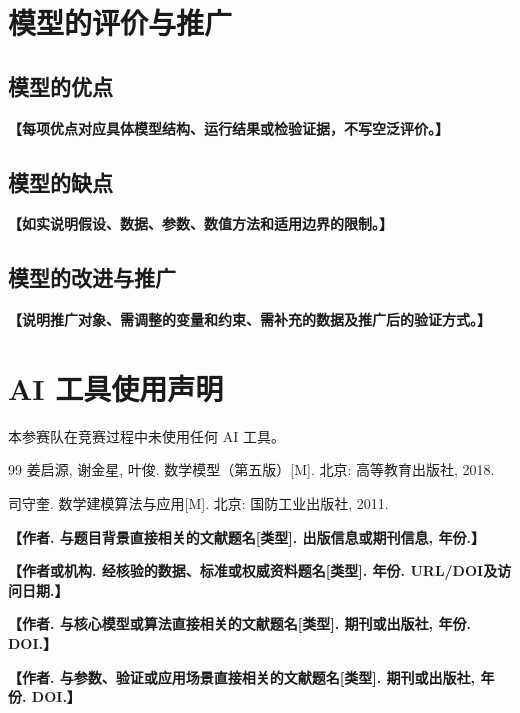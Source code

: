 \documentclass[UTF8,a4paper,12pt,zihao=-4]{ctexart}
\newcommand{\TemplateField}[1]{\textbf{【#1】}}
\newif\ifusedai
\newcommand{\AIUsageSummary}{语言润色、代码调试与排版核验等}
\begin{document}
\section{模型的评价与推广}

\subsection{模型的优点}
\TemplateField{每项优点对应具体模型结构、运行结果或检验证据，不写空泛评价。}

\subsection{模型的缺点}
\TemplateField{如实说明假设、数据、参数、数值方法和适用边界的限制。}

\subsection{模型的改进与推广}
\TemplateField{说明推广对象、需调整的变量和约束、需补充的数据及推广后的验证方式。}

\label{text:counted-last}

\clearpage
\section*{AI 工具使用声明}
\ifusedai
本参赛队在竞赛过程中使用了 AI 工具，主要用于\AIUsageSummary，详细使用情况见支撑材料。
\else
本参赛队在竞赛过程中未使用任何 AI 工具。
\fi

\renewcommand{\refname}{\chinese{section}、参考文献}
\addtocounter{section}{1}
\begin{thebibliography}{99}
  姜启源, 谢金星, 叶俊.
  \newblock 数学模型（第五版）[M].
  \newblock 北京: 高等教育出版社, 2018.

  司守奎.
  \newblock 数学建模算法与应用[M].
  \newblock 北京: 国防工业出版社, 2011.

  \TemplateField{作者. 与题目背景直接相关的文献题名[类型]. 出版信息或期刊信息, 年份.}

  \TemplateField{作者或机构. 经核验的数据、标准或权威资料题名[类型]. 年份. URL/DOI及访问日期.}

  \TemplateField{作者. 与核心模型或算法直接相关的文献题名[类型]. 期刊或出版社, 年份. DOI.}

  \TemplateField{作者. 与参数、验证或应用场景直接相关的文献题名[类型]. 期刊或出版社, 年份. DOI.}
\end{thebibliography}
\label{page:counted-last}
\end{document}
